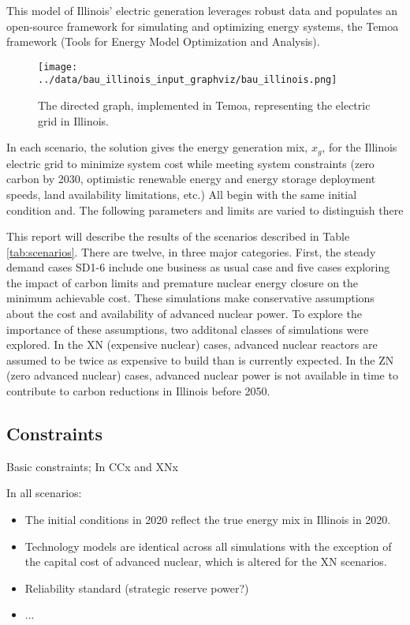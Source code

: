 This model of Illinois' electric generation leverages robust data and populates 
an open-source framework for simulating and optimizing energy systems, 
the Temoa framework (Tools for Energy Model Optimization and Analysis). 


\begin{wrapfigure}{l}{0.3\linewidth}
\begin{center}
\texttt{[image: ../data/bau\_illinois\_input\_graphviz/bau\_illinois.png]}
\end{center}
\caption{The directed graph, implemented in Temoa, representing the electric grid in Illinois.}
\label{fig:temoa_graph}
\end{wrapfigure}

In each scenario, the solution gives the energy generation mix, $x_g$,
for the Illinois electric grid to minimize system cost while meeting system
constraints (zero carbon by 2030, optimistic renewable energy and energy
storage deployment speeds, land availability limitations, etc.)
All begin with the same initial condition and. The following parameters and limits are varied to distinguish there

This report will describe the results of the scenarios described in Table \ref{tab:scenarios}. 
There are twelve, in three major categories. First, the steady demand cases SD1-6 include one business as usual case and five cases exploring the impact of carbon limits and premature nuclear energy closure on the minimum achievable cost. These simulations make conservative assumptions about the cost and availability of advanced nuclear power. To explore the importance of these assumptions, two additonal classes of simulations were explored. In the XN (expensive nuclear) cases, advanced nuclear reactors are assumed to be twice as expensive to build than is currently expected. In the ZN (zero advanced nuclear) cases, advanced nuclear power is not available in time to contribute to carbon reductions in Illinois before 2050.  

\subsection{Constraints}
Basic constraints;
In CCx and XNx

In all scenarios:
\begin{itemize}
        \item The initial conditions in 2020 reflect the true energy mix in 
                Illinois in 2020.
        \item Technology models are identical across all simulations with the exception of the capital cost of advanced nuclear, which is altered for the XN scenarios.
        \item Reliability standard (strategic reserve power?)
	\item ...
\end{itemize}

